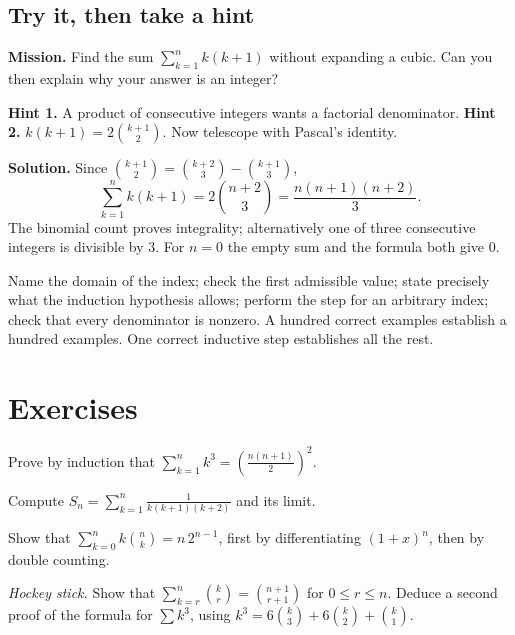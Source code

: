 \subsection*{Try it, then take a hint}
\textbf{Mission.} Find the sum $\sum_{k=1}^n k(k+1)$ without expanding a cubic. Can you then explain why your answer is an integer?

\textbf{Hint 1.} A product of consecutive integers wants a factorial denominator. \textbf{Hint 2.} $k(k+1)=2\binom{k+1}2$. Now telescope with Pascal's identity.

\textbf{Solution.} Since $\binom{k+1}2=\binom{k+2}3-\binom{k+1}3$,
\[
\sum_{k=1}^n k(k+1)=2\binom{n+2}3=\frac{n(n+1)(n+2)}3.
\]
The binomial count proves integrality; alternatively one of three consecutive integers is divisible by $3$. For $n=0$ the empty sum and the formula both give $0$.

\begin{reminder}
Name the domain of the index; check the first admissible value; state precisely what the induction hypothesis allows; perform the step for an arbitrary index; check that every denominator is nonzero. A hundred correct examples establish a hundred examples. One correct inductive step establishes all the rest.
\end{reminder}


\section{Exercises}

\begin{exercise}[$\star$]\label{ex:cubes}
Prove by induction that $\displaystyle\sum_{k=1}^n k^3=\left(\frac{n(n+1)}2\right)^2$.
\end{exercise}

\begin{exercise}[$\star$]\label{ex:tel3}
Compute $\displaystyle S_n=\sum_{k=1}^n\frac1{k(k+1)(k+2)}$ and its limit.
\end{exercise}

\begin{exercise}[$\star$]\label{ex:kbinom}
Show that $\displaystyle\sum_{k=0}^n k\binom nk=n\,2^{n-1}$, first by differentiating $(1+x)^n$, then by double counting.
\end{exercise}

\begin{exercise}[$\star\star$]\label{ex:hockey}
\emph{Hockey stick.} Show that $\displaystyle\sum_{k=r}^n\binom kr=\binom{n+1}{r+1}$ for $0\le r\le n$.
Deduce a second proof of the formula for $\sum k^3$, using $k^3=6\binom k3+6\binom k2+\binom k1$.
\end{exercise}

